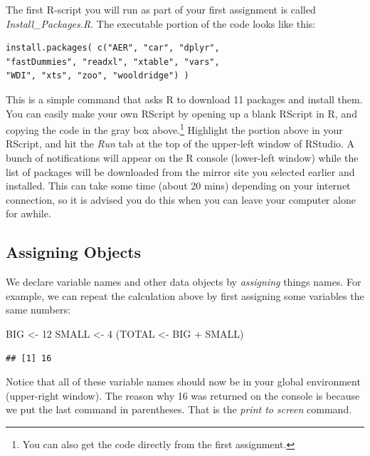 \documentclass[
]{book}
\newenvironment{Shaded}{\begin{snugshade}}{\end{snugshade}}
\newcommand{\DecValTok}[1]{\textcolor[rgb]{0.00,0.00,0.81}{#1}}
\newcommand{\NormalTok}[1]{#1}
\newcommand{\OtherTok}[1]{\textcolor[rgb]{0.56,0.35,0.01}{#1}}
\newcommand{\SpecialCharTok}[1]{\textcolor[rgb]{0.00,0.00,0.00}{#1}}
\begin{document}
The first R-script you will run as part of your first assignment is called \emph{Install\_Packages.R}. The executable portion of the code looks like this:

\begin{verbatim}
install.packages( c("AER", "car", "dplyr", 
"fastDummies", "readxl", "xtable", "vars",
"WDI", "xts", "zoo", "wooldridge") )
\end{verbatim}

This is a simple command that asks R to download 11 packages and install them. You can easily make your own RScript by opening up a blank RScript in R, and copying the code in the gray box above.\footnote{You can also get the code directly from the first assignment.} Highlight the portion above in your RScript, and hit the \emph{Run} tab at the top of the upper-left window of RStudio. A bunch of notifications will appear on the R console (lower-left window) while the list of packages will be downloaded from the mirror site you selected earlier and installed. This can take some time (about 20 mins) depending on your internet connection, so it is advised you do this when you can leave your computer alone for awhile.

\hypertarget{assigning-objects}{%
\subsection{Assigning Objects}\label{assigning-objects}}

We declare variable names and other data objects by \emph{assigning} things names. For example, we can repeat the calculation above by first assigning some variables the same numbers:

\begin{Shaded}
\begin{Highlighting}[]
\NormalTok{BIG }\OtherTok{\textless{}{-}} \DecValTok{12}
\NormalTok{SMALL }\OtherTok{\textless{}{-}} \DecValTok{4}
\NormalTok{(TOTAL }\OtherTok{\textless{}{-}}\NormalTok{ BIG }\SpecialCharTok{+}\NormalTok{ SMALL)}
\end{Highlighting}
\end{Shaded}

\begin{verbatim}
## [1] 16
\end{verbatim}

Notice that all of these variable names should now be in your global environment (upper-right window). The reason why 16 was returned on the console is because we put the last command in parentheses. That is the \emph{print to screen} command.
\end{document}
